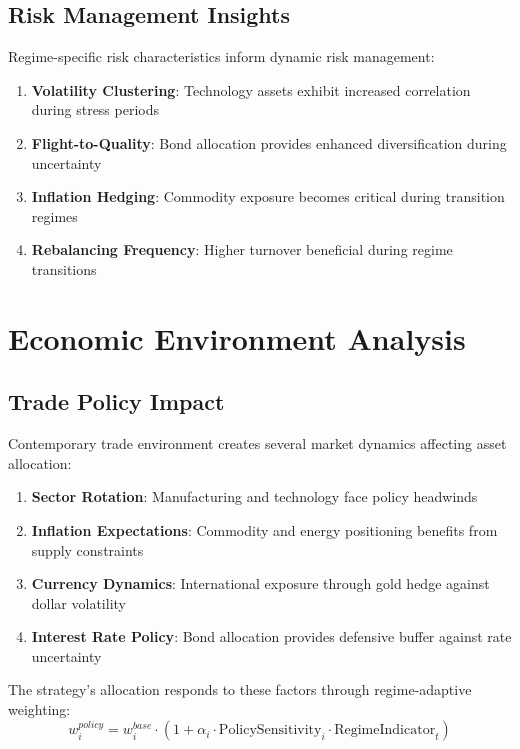 \documentclass[onecolumn,ieee]{arithmaxresearch}
\begin{document}
\subsection{Risk Management Insights}

Regime-specific risk characteristics inform dynamic risk management:

\begin{enumerate}
    \item \textbf{Volatility Clustering}: Technology assets exhibit increased correlation during stress periods
    \item \textbf{Flight-to-Quality}: Bond allocation provides enhanced diversification during uncertainty
    \item \textbf{Inflation Hedging}: Commodity exposure becomes critical during transition regimes
    \item \textbf{Rebalancing Frequency}: Higher turnover beneficial during regime transitions
\end{enumerate}

\section{Economic Environment Analysis}

\subsection{Trade Policy Impact}

Contemporary trade environment creates several market dynamics affecting asset allocation:

\begin{enumerate}
    \item \textbf{Sector Rotation}: Manufacturing and technology face policy headwinds
    \item \textbf{Inflation Expectations}: Commodity and energy positioning benefits from supply constraints
    \item \textbf{Currency Dynamics}: International exposure through gold hedge against dollar volatility
    \item \textbf{Interest Rate Policy}: Bond allocation provides defensive buffer against rate uncertainty
\end{enumerate}

The strategy's allocation responds to these factors through regime-adaptive weighting:
\begin{equation}
w_i^{policy} = w_i^{base} \cdot (1 + \alpha_i \cdot \text{PolicySensitivity}_i \cdot \text{RegimeIndicator}_t)
\end{equation}
\end{document}
